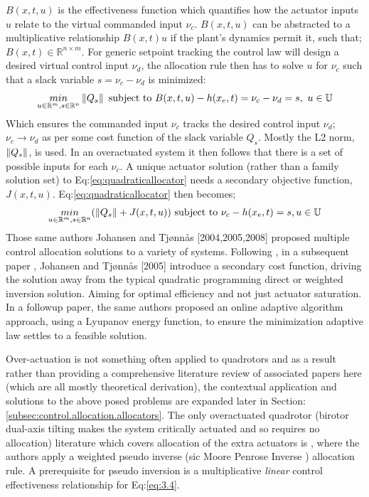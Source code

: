 $B(x,t,u)$ is the effectiveness function which quantifies how the actuator inputs $u$ relate to the virtual commanded input $\nu_c$. $B(x,t,u)$ can be abstracted to a multiplicative relationship $B(x,t)u$ if the plant's dynamics permit it, such that; $B(x,t)\in\mathbb{R}^{n\times m}$. For generic setpoint tracking the control law will design a desired virtual control input $\nu_d$, the allocation rule then has to solve $u$ for $\nu_c$ such that a slack variable $s=\nu_c-\nu_d$ is minimized:
\begin{equation}\label{eq:quadraticallocator}
\underset{u \in \mathbb{R}^m ,s \in \mathbb{R}^n}{min}\left\lVert Q_s\right\rVert ~\text{subject to} ~B(x,t,u) - h(x_e,t)=\nu_c-\nu_d=s,~u \in \mathbb{U}
\end{equation}
Which ensures the commanded input $\nu_c$ tracks the desired control input $\nu_d$; $\nu_c\rightarrow\nu_d$ as per some cost function of the slack variable $Q_s$. Mostly the L2 norm, $\left\lVert Q_s\right\rVert$, is used. In an overactuated system it then follows that there is a set of possible inputs for each $\nu_c$. A unique actuator solution (rather than a family solution set) to Eq:\ref{eq:quadraticallocator} needs a secondary objective function, $J(x,t,u)$. Eq:\ref{eq:quadraticallocator} then becomes;
\begin{equation} \label{eq:quadraticallocatorcost}
\underset{u \in \mathbb{R}^m ,s \in \mathbb{R}^n}{min}(\left\lVert Q_s\right\rVert+J(x,t,u)) ~\text{subject to} ~\nu_c - h(x_e,t)=s, u \in \mathbb{U}
\end{equation}
\newpage
Those same authors Johansen and Tjønnås [2004,2005,2008] proposed multiple control allocation solutions to a variety of systems. Following \cite{allocation}, in a subsequent paper \cite{efficientallocation}, Johansen and Tjønnås [2005] introduce a secondary cost function, driving the solution away from the typical quadratic programming direct or weighted inversion solution. Aiming for optimal efficiency and not just actuator saturation. In a followup paper\cite{adaptiveallocation}, the same authors proposed an online adaptive algorithm approach, using a Lyupanov energy function, to ensure the minimization adaptive law settles to a feasible solution.
\par
Over-actuation is not something often applied to quadrotors and as a result rather than providing a comprehensive literature review of associated papers here (which are all mostly theoretical derivation), the contextual application and solutions to the above posed problems are expanded later in Section:\ref{subsec:control.allocation.allocators}. The only overactuated quadrotor (birotor dual-axis tilting makes the system critically actuated and so requires no allocation) literature which covers allocation of the extra actuators is \cite{tiltgasco,tiltrihani}, where the authors apply a weighted pseudo inverse (sic Moore Penrose Inverse \cite{moorepenrose}) allocation rule. A prerequisite for pseudo inversion is a multiplicative \emph{linear} control effectiveness relationship for Eq:\ref{eq:3.4}. 
